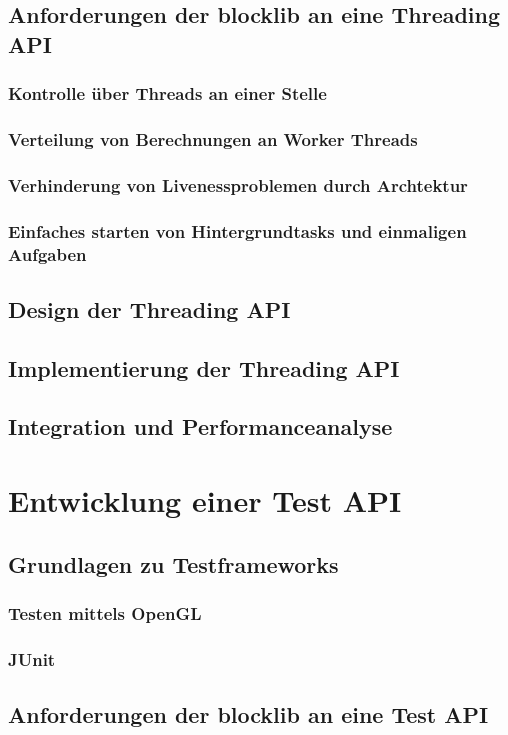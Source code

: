 \documentclass[12pt,a4paper,listof=totocnumbered,parskip=half]{scrreprt}
\begin{document}
\section{Anforderungen der blocklib an eine Threading API}
\subsection{Kontrolle über Threads an einer Stelle}
\subsection{Verteilung von Berechnungen an Worker Threads}
\subsection{Verhinderung von Livenessproblemen durch Archtektur}
\subsection{Einfaches starten von Hintergrundtasks und einmaligen Aufgaben}
\section{Design der Threading API}
\section{Implementierung der Threading API}
\section{Integration und Performanceanalyse}

\chapter{Entwicklung einer Test API}
\section{Grundlagen zu Testframeworks}
\subsection{Testen mittels OpenGL}
\subsection{JUnit}
\section{Anforderungen der blocklib an eine Test API}
\end{document}
